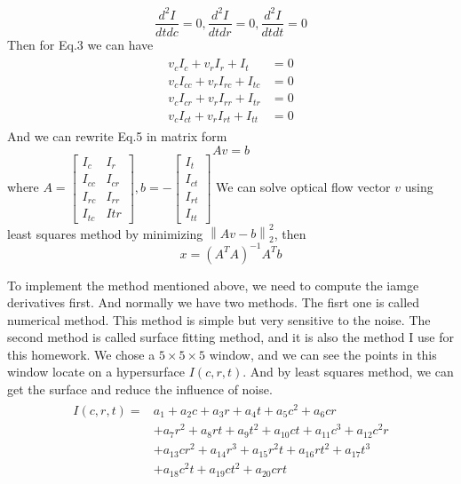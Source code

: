 \documentclass{article}
\begin{document}
\begin{equation}
\frac{d^2I}{dtdc}=0,\frac{d^2I}{dtdr}=0,\frac{d^2I}{dtdt}=0
\end{equation}
Then for Eq.3 we can have
\begin{align}
\begin{split}
v_cI_c+v_rI_r+I_t&=0\\
v_cI_{cc}+v_rI_{rc}+I_{tc}&=0\\
v_cI_{cr}+v_rI_{rr}+I_{tr}&=0\\
v_cI_{ct}+v_rI_{rt}+I_{tt}&=0
\end{split}
\end{align}
And we can rewrite Eq.5 in matrix form
\begin{equation}
Av=b
\end{equation}
where $A = \begin{bmatrix}I_c&I_r\\I_{cc}&I_{cr}\\I_{rc}&I_{rr}\\I_{tc}&I{tr}\end{bmatrix},b = -\begin{bmatrix}I_t\\I_{ct}\\I_{rt}\\I_{tt}\end{bmatrix}$
We can solve optical flow vector $v$ using least squares method by minimizing $\left\|Av-b\right\|_2^2$, then 
\begin{equation}
x=(A^TA)^{-1}A^Tb
\end{equation}
\par
To implement the method mentioned above, we need to compute the iamge derivatives first. And normally we have two methods. The fisrt one is called numerical method. This method is simple but very sensitive to the noise\cite{ref1}. The second method is called surface fitting method, and it is also the method I use for this homework. We chose a $5\times5\times5$ window, and we can see the points in this window locate on a hypersurface $I(c,r,t)$. And by least squares method, we can get the surface and reduce the influence of noise.
\begin{align}
\begin{split}
I(c,r,t)=&a_1+a_2c+a_3r+a_4t+a_5c^2+a_6cr\\
&+a_7r^2+a_8rt+a_9t^2+a_{10}ct+a_{11}c^3+a_{12}c^2r\\
&+a_{13}cr^2+a_{14}r^3+a_{15}r^2t+a_{16}rt^2+a_{17}t^3\\
&+a_{18}c^2t+a_{19}ct^2+a_{20}crt
\end{split}
\end{align}
\end{document}
